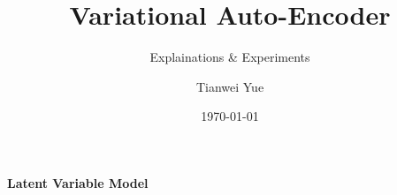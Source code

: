 \documentclass{beamer}
\begin{document}
{%
\title{Variational Auto-Encoder}    %
\subtitle{Explainations \& Experiments}   %
\author{Tianwei Yue}  %
\date{\today}   %
\frame{\titlepage}
}%
{%
\begin{frame}
\begin{center}
{\bf\LARGE Latent Variable Model}
\end{center}
\end{frame}
}%
\end{document}

